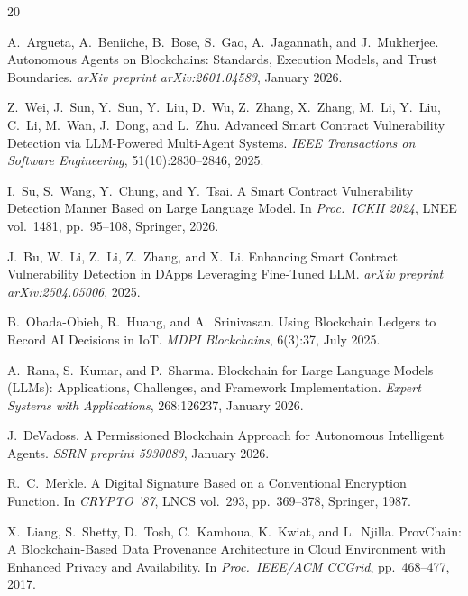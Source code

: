 \documentclass[manuscript,nonacm]{acmart}
\begin{document}


\begin{thebibliography}{20}

A.~Argueta, A.~Beniiche, B.~Bose, S.~Gao, A.~Jagannath, and J.~Mukherjee.
\newblock Autonomous Agents on Blockchains: Standards, Execution Models, and Trust Boundaries.
\newblock \emph{arXiv preprint arXiv:2601.04583}, January 2026.

Z.~Wei, J.~Sun, Y.~Sun, Y.~Liu, D.~Wu, Z.~Zhang, X.~Zhang, M.~Li, Y.~Liu, C.~Li, M.~Wan, J.~Dong, and L.~Zhu.
\newblock Advanced Smart Contract Vulnerability Detection via LLM-Powered Multi-Agent Systems.
\newblock \emph{IEEE Transactions on Software Engineering}, 51(10):2830--2846, 2025.

I.~Su, S.~Wang, Y.~Chung, and Y.~Tsai.
\newblock A Smart Contract Vulnerability Detection Manner Based on Large Language Model.
\newblock In \emph{Proc.\ ICKII 2024}, LNEE vol.~1481, pp.~95--108, Springer, 2026.

J.~Bu, W.~Li, Z.~Li, Z.~Zhang, and X.~Li.
\newblock Enhancing Smart Contract Vulnerability Detection in DApps Leveraging Fine-Tuned LLM.
\newblock \emph{arXiv preprint arXiv:2504.05006}, 2025.

B.~Obada-Obieh, R.~Huang, and A.~Srinivasan.
\newblock Using Blockchain Ledgers to Record AI Decisions in IoT.
\newblock \emph{MDPI Blockchains}, 6(3):37, July 2025.

A.~Rana, S.~Kumar, and P.~Sharma.
\newblock Blockchain for Large Language Models (LLMs): Applications, Challenges, and Framework Implementation.
\newblock \emph{Expert Systems with Applications}, 268:126237, January 2026.

J.~DeVadoss.
\newblock A Permissioned Blockchain Approach for Autonomous Intelligent Agents.
\newblock \emph{SSRN preprint 5930083}, January 2026.

R.~C.~Merkle.
\newblock A Digital Signature Based on a Conventional Encryption Function.
\newblock In \emph{CRYPTO '87}, LNCS vol.~293, pp.~369--378, Springer, 1987.

X.~Liang, S.~Shetty, D.~Tosh, C.~Kamhoua, K.~Kwiat, and L.~Njilla.
\newblock ProvChain: A Blockchain-Based Data Provenance Architecture in Cloud Environment with Enhanced Privacy and Availability.
\newblock In \emph{Proc.\ IEEE/ACM CCGrid}, pp.~468--477, 2017.


\end{thebibliography}
\end{document}
